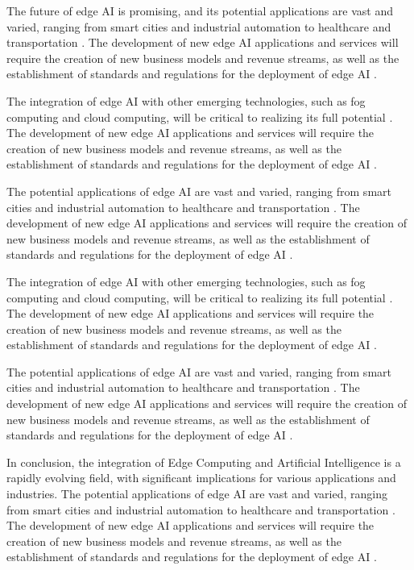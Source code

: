 \documentclass[11pt,a4paper]{article}
\begin{document}
The future of edge AI is promising, and its potential applications are vast and varied, ranging from smart cities and industrial automation to healthcare and transportation \cite{arxiv:2402.13056}. The development of new edge AI applications and services will require the creation of new business models and revenue streams, as well as the establishment of standards and regulations for the deployment of edge AI \cite{arxiv:2309.05416}. 

The integration of edge AI with other emerging technologies, such as fog computing and cloud computing, will be critical to realizing its full potential \cite{arxiv:2404.13411}. The development of new edge AI applications and services will require the creation of new business models and revenue streams, as well as the establishment of standards and regulations for the deployment of edge AI \cite{arxiv:1906.08452}. 

The potential applications of edge AI are vast and varied, ranging from smart cities and industrial automation to healthcare and transportation \cite{arxiv:2201.00242}. The development of new edge AI applications and services will require the creation of new business models and revenue streams, as well as the establishment of standards and regulations for the deployment of edge AI \cite{arxiv:1909.08747}. 

The integration of edge AI with other emerging technologies, such as fog computing and cloud computing, will be critical to realizing its full potential \cite{arxiv:2111.10076}. The development of new edge AI applications and services will require the creation of new business models and revenue streams, as well as the establishment of standards and regulations for the deployment of edge AI \cite{arxiv:2106.10063}. 

The potential applications of edge AI are vast and varied, ranging from smart cities and industrial automation to healthcare and transportation \cite{arxiv:2101.10417}. The development of new edge AI applications and services will require the creation of new business models and revenue streams, as well as the establishment of standards and regulations for the deployment of edge AI \cite{arxiv:2105.03559}. 

In conclusion, the integration of Edge Computing and Artificial Intelligence is a rapidly evolving field, with significant implications for various applications and industries. The potential applications of edge AI are vast and varied, ranging from smart cities and industrial automation to healthcare and transportation \cite{arxiv:2206.07164}. The development of new edge AI applications and services will require the creation of new business models and revenue streams, as well as the establishment of standards and regulations for the deployment of edge AI \cite{arxiv:2305.01974}. 
\end{document}
